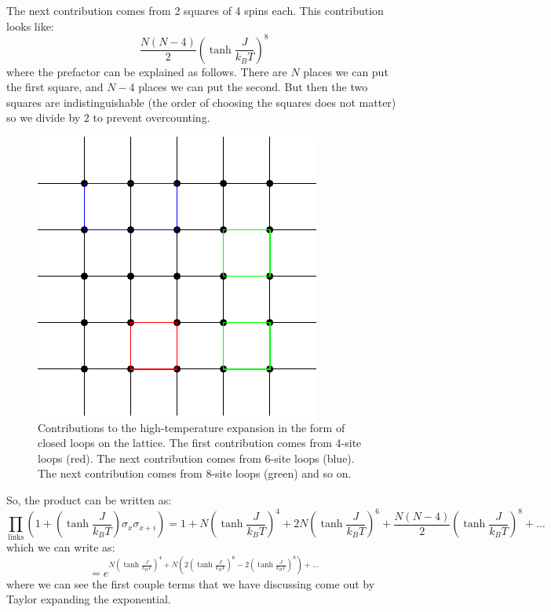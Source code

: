 The next contribution comes from 2 squares of 4 spins each. This contribution looks like:
\begin{equation}
    \frac{N(N-4)}{2}\left(\tanh\frac{J}{k_B T}\right)^8
\end{equation}
where the prefactor can be explained as follows. There are $N$ places we can put the first square, and $N-4$ places we can put the second. But then the two squares are indistinguishable (the order of choosing the squares does not matter) so we divide by $2$ to prevent overcounting. 

\begin{figure}[htbp]
    \centering
    \includegraphics{Images/fig-loops.pdf}
    \caption{Contributions to the high-temperature expansion in the form of closed loops on the lattice. The first contribution comes from 4-site loops (red). The next contribution comes from 6-site loops (blue). The next contribution comes from 8-site loops (green) and so on.}
    \label{fig-loops}
\end{figure}

So, the product can be written as:
\begin{equation}
    \prod_{\text{links}}\left(1 + (\tanh\frac{J}{k_B T})\sigma_x\sigma_{x + i}\right) = 1 + N\left(\tanh\frac{J}{k_B T}\right)^4 + 2N\left(\tanh\frac{J}{k_B T}\right)^6 + \frac{N(N-4)}{2}\left(\tanh\frac{J}{k_B T}\right)^8 + \ldots
\end{equation}
which we can write as:
\begin{equation}
    = e^{N\left(\tanh\frac{J}{k_B T}\right)^4 + N\left(2\left(\tanh\frac{J}{k_B T}\right)^6 - 2\left(\tanh\frac{J}{k_B T}\right)^8\right) + \ldots }
\end{equation}
where we can see the first couple terms that we have discussing come out by Taylor expanding the exponential.

